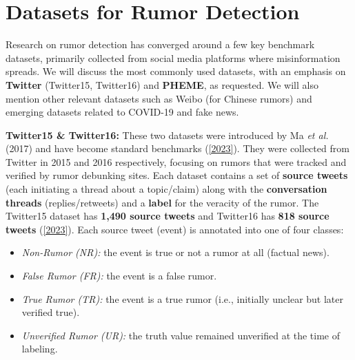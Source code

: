 \documentclass[12pt,a4paper]{report}
\begin{document}
\chapter{Datasets for Rumor Detection}

Research on rumor detection has converged around a few key benchmark datasets, primarily collected from social media platforms where misinformation spreads. We will discuss the most commonly used datasets, with an emphasis on \textbf{Twitter} (Twitter15, Twitter16) and \textbf{PHEME}, as requested. We will also mention other relevant datasets such as Weibo (for Chinese rumors) and emerging datasets related to COVID-19 and fake news.

\textbf{Twitter15 \& Twitter16:} These two datasets were introduced by Ma \textit{et al.} (2017) and have become standard benchmarks (\href{https://aclanthology.org/2023.findings-eacl.55.pdf#:~:text=Twitter%2015%20and%20Twitter%2016%3A,dataset%20includes%204%2C664%20verified%20posts}{[2023]}). They were collected from Twitter in 2015 and 2016 respectively, focusing on rumors that were tracked and verified by rumor debunking sites. Each dataset contains a set of \textbf{source tweets} (each initiating a thread about a topic/claim) along with the \textbf{conversation threads} (replies/retweets) and a \textbf{label} for the veracity of the rumor. The Twitter15 dataset has \textbf{1,490 source tweets} and Twitter16 has \textbf{818 source tweets} (\href{https://aclanthology.org/2023.findings-eacl.55.pdf#:~:text=Twitter%2015%20and%20Twitter%2016%3A,Rumor%20%28Zubiaga%20et%20al.%2C%202016}{[2023]}). Each source tweet (event) is annotated into one of four classes:
\begin{itemize}[leftmargin=1.2cm]
    \item \textit{Non-Rumor (NR):} the event is true or not a rumor at all (factual news).
    \item \textit{False Rumor (FR):} the event is a false rumor.
    \item \textit{True Rumor (TR):} the event is a true rumor (i.e., initially unclear but later verified true).
    \item \textit{Unverified Rumor (UR):} the truth value remained unverified at the time of labeling.
\end{itemize}
\end{document}
